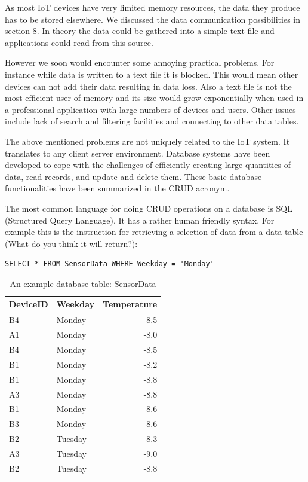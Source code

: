 \documentclass[]{book}
\theoremstyle{definition}
\theoremstyle{definition}
\theoremstyle{remark}
\begin{document}
As most IoT devices have very limited memory resources, the data they
produce has to be stored elsewhere. We discussed the data communication
possibilities in \protect\hyperlink{communication}{section 8}. In theory
the data could be gathered into a simple text file and applications
could read from this source.

However we soon would encounter some annoying practical problems. For
instance while data is written to a text file it is blocked. This would
mean other devices can not add their data resulting in data loss. Also a
text file is not the most efficient user of memory and its size would
grow exponentially when used in a professional application with large
numbers of devices and users. Other issues include lack of search and
filtering facilities and connecting to other data tables.

The above mentioned problems are not uniquely related to the IoT system.
It translates to any client server environment. Database systems have
been developed to cope with the challenges of efficiently creating large
quantities of data, read records, and update and delete them. These
basic database functionalities have been summarized in the CRUD acronym.

The most common language for doing CRUD operations on a database is SQL
(Structured Query Language). It has a rather human friendly syntax. For
example this is the instruction for retrieving a selection of data from
a data table (What do you think it will return?):

\begin{verbatim}
SELECT * FROM SensorData WHERE Weekday = 'Monday'
\end{verbatim}

\begin{table}

\caption{\label{tab:dbtable}An example database table: SensorData}
\centering
\begin{tabular}[t]{llr}
\toprule
DeviceID & Weekday & Temperature\\
\midrule
B4 & Monday & -8.5\\
A1 & Monday & -8.0\\
B4 & Monday & -8.5\\
B1 & Monday & -8.2\\
B1 & Monday & -8.8\\
\addlinespace
A3 & Monday & -8.8\\
B1 & Monday & -8.6\\
B3 & Monday & -8.6\\
B2 & Tuesday & -8.3\\
A3 & Tuesday & -9.0\\
B2 & Tuesday & -8.8\\
\bottomrule
\end{tabular}
\end{table}
\end{document}
